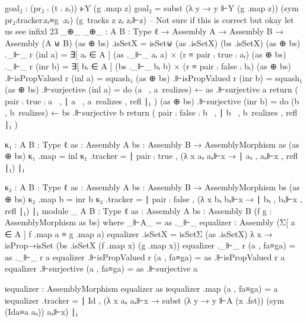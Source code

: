                  goal₂ : (pr₂ ⨾ (t ⨾ zᵣ)) ⊩Y (g .map z)
                 goal₂ = subst (λ y → y ⊩Y (g .map z)) (sym pr₂⨾tracker⨾zᵣ≡g~⨾zᵣ) (g~tracks z zᵣ zᵣ⊩z)
  -- Not sure if this is correct but okay let us see
  infixl 23 _⊕_
  _⊕_ : {A B : Type ℓ} → Assembly A → Assembly B → Assembly (A ⊎ B)
  (as ⊕ bs) .isSetX = isSet⊎ (as .isSetX) (bs .isSetX)
  (as ⊕ bs) ._⊩_ r (inl a) = ∃[ aᵣ ∈ A ] (as ._⊩_ aᵣ a) × (r ≡ pair ⨾ true ⨾ aᵣ)
  (as ⊕ bs) ._⊩_ r (inr b) = ∃[ bᵣ ∈ A ] (bs ._⊩_ bᵣ b) × (r ≡ pair ⨾ false ⨾ bᵣ)
  (as ⊕ bs) .⊩isPropValued r (inl a) = squash₁
  (as ⊕ bs) .⊩isPropValued r (inr b) = squash₁
  (as ⊕ bs) .⊩surjective (inl a) =
                                 do
                                 (a~ , a~realizes) ← as .⊩surjective a
                                 return ( pair ⨾ true ⨾ a~
                                        , ∣ a~
                                        , a~realizes
                                        , refl ∣₁
                                        )
  (as ⊕ bs) .⊩surjective (inr b) =
                                 do
                                 (b~ , b~realizes) ← bs .⊩surjective b
                                 return ( pair ⨾ false ⨾ b~
                                        , ∣ b~
                                        , b~realizes
                                        , refl ∣₁
                                        )
                                        
  κ₁ : {A B : Type ℓ} {as : Assembly A} {bs : Assembly B} → AssemblyMorphism as (as ⊕ bs)
  κ₁ .map = inl
  κ₁ .tracker = ∣ pair ⨾ true , (λ x aₓ aₓ⊩x → ∣ aₓ , aₓ⊩x , refl ∣₁) ∣₁

  κ₂ : {A B : Type ℓ} {as : Assembly A} {bs : Assembly B} → AssemblyMorphism bs (as ⊕ bs)
  κ₂ .map b = inr b
  κ₂ .tracker = ∣ pair ⨾ false , (λ x bₓ bₓ⊩x → ∣ bₓ , bₓ⊩x , refl ∣₁) ∣₁
  module _ {A B : Type ℓ} {as : Assembly A} {bs : Assembly B} (f g : AssemblyMorphism as bs) where
    _⊩A_ = as ._⊩_
    equalizer : Assembly (Σ[ a ∈ A ] f .map a ≡ g .map a)
    equalizer .isSetX = isSetΣ (as .isSetX) λ x → isProp→isSet (bs .isSetX (f .map x) (g .map x))
    equalizer ._⊩_ r (a , fa≡ga) = as ._⊩_ r a
    equalizer .⊩isPropValued r (a , fa≡ga) = as .⊩isPropValued r a
    equalizer .⊩surjective (a , fa≡ga) = as .⊩surjective a

    ιequalizer : AssemblyMorphism equalizer as
    ιequalizer .map (a , fa≡ga) = a
    ιequalizer .tracker = ∣ Id , (λ x aₓ aₓ⊩x → subst (λ y → y ⊩A (x .fst)) (sym (Ida≡a aₓ)) aₓ⊩x) ∣₁

